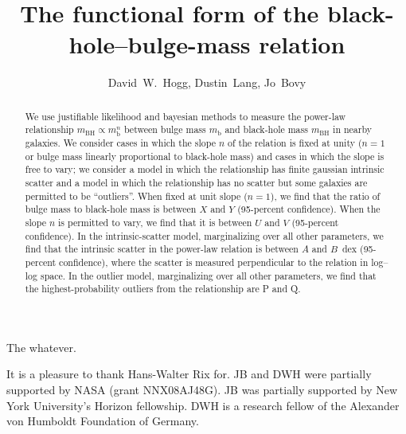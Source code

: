 \documentclass[12pt,preprint]{aastex}
\newcounter{address}
\newcommand{\mbulge}{m_{\mathrm{b}}}
\newcommand{\mbh}{m_{\mathrm{BH}}}
\newcommand{\slope}{n}
\begin{document}
\title{The functional form of the black-hole--bulge-mass relation}
\author{David~W.~Hogg\altaffilmark{\ref{CCPP},\ref{MPIA},\ref{email}},
        Dustin~Lang\altaffilmark{\ref{UofT},\ref{Princeton}},
        Jo~Bovy\altaffilmark{\ref{CCPP}}}

\begin{abstract}
We use justifiable likelihood and bayesian methods to measure the
power-law relationship $\mbh\propto\mbulge^\slope$ between bulge mass
$\mbulge$ and black-hole mass $\mbh$ in nearby galaxies.  We consider
cases in which the slope $n$ of the relation is fixed at unity ($n=1$
or bulge mass linearly proportional to black-hole mass) and cases in
which the slope is free to vary; we consider a model in which the
relationship has finite gaussian intrinsic scatter and a model in
which the relationship has no scatter but some galaxies are permitted
to be ``outliers''.  When fixed at unit slope ($n=1$), we find that
the ratio of bulge mass to black-hole mass is between $X$ and $Y$
(95-percent confidence).  When the slope $\slope$ is permitted to
vary, we find that it is between $U$ and $V$ (95-percent confidence).
In the intrinsic-scatter model, marginalizing over all other
parameters, we find that the intrinsic scatter in the power-law
relation is between $A$ and $B$~dex (95-percent confidence), where the
scatter is measured perpendicular to the relation in log--log space.
In the outlier model, marginalizing over all other parameters, we find
that the highest-probability outliers from the relationship are P and
Q.
\end{abstract}

The whatever.

\acknowledgments It is a pleasure to thank Hans-Walter Rix for. JB and
DWH were partially supported by NASA (grant NNX08AJ48G).  JB was
partially supported by New York University's Horizon fellowship.  DWH
is a research fellow of the Alexander von Humboldt Foundation of
Germany.
\end{document}

